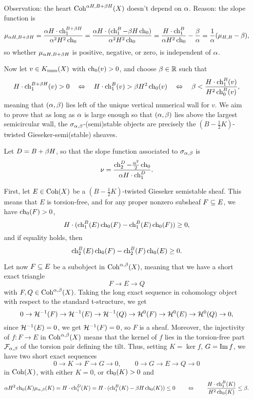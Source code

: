 \documentclass[letterpaper,10pt]{article}
\begin{document}
Observation: the heart $\mathrm{Coh}^{\alpha H, B + \beta H}(X)$ doesn't depend on $\alpha$. Reason: the slope function is
\[ \mu_{\alpha H, B + \beta H} = \frac{\alpha H \cdot \operatorname{\mathrm{ch}}_1^{B + \beta H}}{\alpha^2 H^2 \operatorname{\mathrm{ch}}_0} = \frac{\alpha H \cdot (\operatorname{\mathrm{ch}}_1^B - \beta H \operatorname{\mathrm{ch}}_0)}{\alpha^2 H^2 \operatorname{\mathrm{ch}}_0} = \frac{H\cdot\operatorname{\mathrm{ch}}_1^B}{\alpha H^2 \operatorname{\mathrm{ch}}_0} - \frac{\beta}{\alpha} = \frac{1}{\alpha}(\mu_{H, B} - \beta), \]
so whether $\mu_{\alpha H, B + \beta H}$ is positive, negative, or zero, is independent of $\alpha$.

Now let $v \in K_{\mathrm{num}}(X)$ with $\operatorname{\mathrm{ch}}_0(v) > 0$, and choose $\beta \in \mathbb{R}$ such that 
\begin{align*}
    H \cdot \operatorname{\mathrm{ch}}_1^{B+\beta H}(v) > 0  \quad \Leftrightarrow \quad H \cdot \operatorname{\mathrm{ch}}_1^B(v) > \beta H^2 \operatorname{\mathrm{ch}}_0(v) \quad \Leftrightarrow \quad \beta < \frac{H \cdot \operatorname{\mathrm{ch}}_1^B(v)}{H^2 \operatorname{\mathrm{ch}}_0^B(v)},
\end{align*}
meaning that $(\alpha, \beta)$ lies left of the unique vertical numerical wall for $v$. We aim to prove that as long as $\alpha$ is large enough so that $(\alpha, \beta)$ lies above the largest semicircular wall, the $\sigma_{\alpha,\beta}$-(semi)stable objects are precisely the $(B-\frac{1}{2}K)$-twisted Gieseker-semi(stable) sheaves.

Let $D = B + \beta H$, so that the slope function associated to $\sigma_{\alpha,\beta}$ is 
\[ \nu = \frac{\operatorname{\mathrm{ch}}_2^D - \frac{\alpha^2}{2}\operatorname{\mathrm{ch}}_0}{\alpha H \cdot \operatorname{\mathrm{ch}}_1^D}. \]

First, let $E \in \mathrm{Coh}(X)$ be a $(B-\frac{1}{2}K)$-twisted Gieseker semistable sheaf. This means that $E$ is torsion-free, and for any proper nonzero subsheaf $F \subseteq E$, we have $\operatorname{\mathrm{ch}}_0(F) > 0$, 
\[ H\cdot (\operatorname{\mathrm{ch}}_1^B(E) \operatorname{\mathrm{ch}}_0(F) - \operatorname{\mathrm{ch}}_1^B(E) \operatorname{\mathrm{ch}}_0(F)) \ge 0,  \]
and if equality holds, then
\[ \operatorname{\mathrm{ch}}_2^B(E) \operatorname{\mathrm{ch}}_0(F) - \operatorname{\mathrm{ch}}_2^B(F) \operatorname{\mathrm{ch}}_0(E) \ge 0. \]

Let now $F \subseteq E$ be a subobject in $\mathrm{Coh}^{\alpha, \beta}(X)$, meaning that we have a short exact triangle
\[ F \to E \to Q \]
with $F, Q \in \mathrm{Coh}^{\alpha, \beta}(X)$. Taking the long exact sequence in cohomology object with respect to the standard t-structure, we get
\[ 0 \to \mathcal{H}^{-1}(F) \to \mathcal{H}^{-1}(E) \to \mathcal{H}^{-1}(Q) \to \mathcal{H}^0(F) \to \mathcal{H}^0(E) \to \mathcal{H}^0(Q) \to 0, \]
since $\mathcal{H}^{-1}(E) = 0$, we get $\mathcal{H}^{-1}(F) = 0$, so $F$ is a sheaf. Moreover, the injectivity of $f: F \to E$ in $\mathrm{Coh}^{\alpha,\beta}(X)$ means that the kernel of $f$ lies in the torsion-free part $\mathcal{F}_{\alpha,\beta}$ of the torsion pair defining the tilt. Thus, setting $K = \ker f$, $G = \mathrm{Im}\, f$, we have two short exact sequences
\[ 0 \to K \to F \to G \to 0, \qquad 0 \to G \to E \to Q \to 0 \]
in $\mathrm{Coh}(X)$, with either $K = 0$, or $\operatorname{\mathrm{ch}}_0(K) > 0$ and  
\[ \alpha H^2 \operatorname{\mathrm{ch}}_0(K) \mu_{\alpha, \beta}(K) = H \cdot \operatorname{\mathrm{ch}}_1^D(K) = H \cdot (\operatorname{\mathrm{ch}}_1^B(K) - \beta H \operatorname{\mathrm{ch}}_0(K)) \le 0 \qquad \Leftrightarrow \qquad \frac{H \cdot \operatorname{\mathrm{ch}}_1^B(K)}{H^2 \operatorname{\mathrm{ch}}_0(K)} \le \beta. \]
\end{document}

